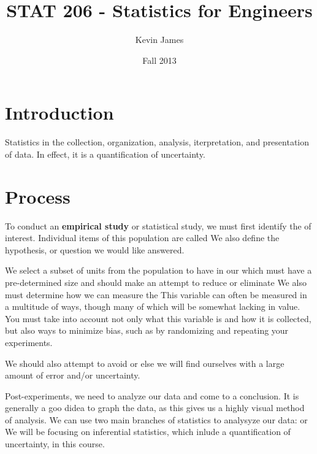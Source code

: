 \documentclass[12pt]{article}
\begin{document}
\title{STAT 206 - Statistics for Engineers}
\author{Kevin James}
\date{\vspace{-2ex}Fall 2013}
\maketitle\HRule

\section*{Introduction}
Statistics in the collection, organization, analysis, iterpretation, and presentation of data. In effect, it is a quantification of uncertainty.

\section*{Process}
To conduct an {\bf empirical study} or statistical study, we must first identify the  of interest. Individual items of this population are called  We also define the hypothesis, or question we would like answered.

We select a subset of units from the population to have in our  which must have a pre-determined size and should make an attempt to reduce or eliminate  We also must determine how we can measure the  This variable can often be measured in a multitude of ways, though many of which will be somewhat lacking in value. You must take into account not only what this variable is and how it is collected, but also ways to minimize bias, such as by randomizing and repeating your experiments.

We should also attempt to avoid  or else we will find ourselves with a large amount of error and/or uncertainty.

Post-experiments, we need to analyze our data and come to a conclusion. It is generally a goo didea to graph the data, as this gives us a highly visual method of analysis. We can use two main branches of statistics to analysyze our data:  or  We will be focusing on inferential statistics, which inlude a quantification of uncertainty, in this course.
\end{document}
